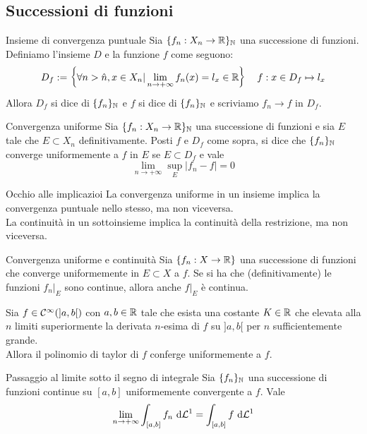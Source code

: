 \documentclass{article}
\begin{document}
\subsection{Successioni di funzioni}

\begin{definition}{Insieme di convergenza puntuale}{}
    Sia $\{f_n :X_n\to\mathbb{R}\}_{\mathbb{N}}$ una successione di funzioni. Definiamo l'insieme $D$ e la funzione $f$ come seguono:
    \[D_f := \left\{\forall n>\hat{n}, x \in X_n | \lim_{n\to+\infty} f_n(x) = l_x \in \mathbb{R} \right\} \quad f : x\in D_f \mapsto l_x\]
    Allora $D_f$ si dice  di $\{f_n\}_{\mathbb{N}}$ e $f$ si dice  di $\{f_n\}_{\mathbb{N}}$ e scriviamo $f_n \to f$ in $D_f$.
\end{definition}
    
\begin{definition}{Convergenza uniforme}{}
    Sia $\{f_n :X_n\to\mathbb{R}\}_{\mathbb{N}}$ una successione di funzioni e sia $E$ tale che $E \subset X_n$ definitivamente. Posti $f$ e $D_f$ come sopra, si dice che $\{f_n\}_{\mathbb{N}}$ converge uniformemente a $f$ in $E$ se $E\subset D_f$ e vale
    \[\lim_{n\to +\infty} \sup_E|f_n - f| = 0\]
\end{definition}

\begin{remark}{Occhio alle implicazioi}{}
    La convergenza uniforme in un insieme implica la convergenza puntuale nello stesso, ma non viceversa.\\
    La continuità in un sottoinsieme implica la continuità della restrizione, ma non viceversa.
\end{remark}

\begin{theorem}{Convergenza uniforme e continuità}{}
    Sia $\{f_n : X \to \mathbb{R}\}$ una successione di funzioni che converge uniformemente in $E\subset X$ a $f$. Se si ha che (definitivamente) le funzioni $f_n|_E$ sono continue, allora anche $f|_E$ è continua.
\end{theorem}

\begin{theorem}
    Sia $f \in \mathcal{C}^\infty(]a,b[)$ con $a,b \in \mathbb{R}$ tale che esista una costante $K \in \mathbb{R}$ che elevata alla $n$ limiti superiormente la derivata $n$-esima di $f$ su $]a,b[$ per $n$ sufficientemente grande.\\
    Allora il polinomio di taylor di $f$ conferge uniformemente a $f$.
\end{theorem}

\begin{proposition}{Passaggio al limite sotto il segno di integrale}{}
    Sia $\{f_n\}_{\mathbb{N}}$ una successione di funzioni continue su $[a,b]$ uniformemente convergente a $f$. Vale
    \[\lim_{n\to+\infty}\int_{[a,b]}f_n \text{ d} \mathcal{L}^1 = \int_{[a,b]} f \text{ d} \mathcal{L}^1\]
\end{proposition}
\end{document}
